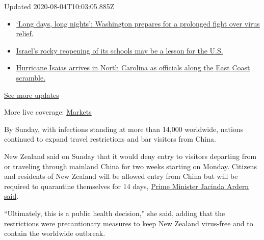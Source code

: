 Updated 2020-08-04T10:03:05.885Z

\begin{itemize}
\tightlist
\item
  \href{https://www.nytimes3xbfgragh.onion/2020/08/04/world/coronavirus-covid-19.html?action=click\&pgtype=Article\&state=default\&region=MAIN_CONTENT_1\&context=storylines_live_updates\#link-6b644638}{`Long
  days, long nights': Washington prepares for a prolonged fight over
  virus relief.}
\item
  \href{https://www.nytimes3xbfgragh.onion/2020/08/04/world/coronavirus-covid-19.html?action=click\&pgtype=Article\&state=default\&region=MAIN_CONTENT_1\&context=storylines_live_updates\#link-7af9fca0}{Israel's
  rocky reopening of its schools may be a lesson for the U.S.}
\item
  \href{https://www.nytimes3xbfgragh.onion/2020/08/04/world/coronavirus-covid-19.html?action=click\&pgtype=Article\&state=default\&region=MAIN_CONTENT_1\&context=storylines_live_updates\#link-33bf9168}{Hurricane
  Isaias arrives in North Carolina as officials along the East Coast
  scramble.}
\end{itemize}

\href{https://www.nytimes3xbfgragh.onion/2020/08/04/world/coronavirus-covid-19.html?action=click\&pgtype=Article\&state=default\&region=MAIN_CONTENT_1\&context=storylines_live_updates}{See
more updates}

More live coverage:
\href{https://www.nytimes3xbfgragh.onion/live/2020/08/03/business/stock-market-today-coronavirus?action=click\&pgtype=Article\&state=default\&region=MAIN_CONTENT_1\&context=storylines_live_updates}{Markets}

By Sunday, with infections standing at more than 14,000 worldwide,
nations continued to expand travel restrictions and bar visitors from
China.

New Zealand said on Sunday that it would deny entry to visitors
departing from or traveling through mainland China for two weeks
starting on Monday. Citizens and residents of New Zealand will be
allowed entry from China but will be required to quarantine themselves
for 14 days,
\href{https://www.tvnz.co.nz/one-news/new-zealand/new-zealand-restrict-travellers-china-coronavirus-spreads-worldwide}{Prime
Minister Jacinda Ardern said}.

``Ultimately, this is a public health decision,'' she said, adding that
the restrictions were precautionary measures to keep New Zealand
virus-free and to contain the worldwide outbreak.


